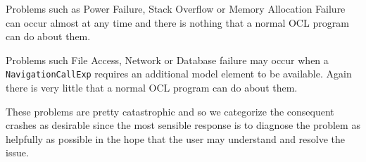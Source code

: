 \documentclass{llncs}
\begin{document}
Problems such as Power Failure, Stack Overflow or Memory Allocation Failure can occur almost at any time and there is nothing that a normal OCL program can do about them.

Problems such File Access, Network or Database failure may occur when a \verb|NavigationCallExp| requires an additional model element to be available. Again there is very little that a normal OCL program can do about them.

These problems are pretty catastrophic and so we categorize the consequent crashes as desirable since the most sensible response is to diagnose the problem as helpfully as possible in the hope that the user may understand and resolve the issue.











\end{document}
